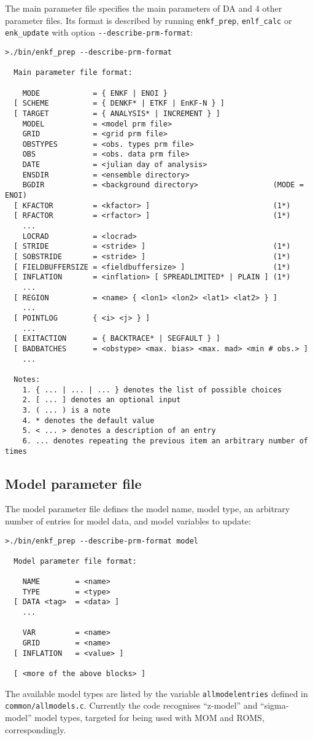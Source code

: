 \documentclass[11pt]{report}
\begin{document}
The main parameter file specifies the main parameters of DA and 4 other parameter files.
Its format is described by running \verb|enkf_prep|, \verb|enlf_calc| or \verb|enk_update| with option \verb|--describe-prm-format|:
\begin{Verbatim}[frame=single,fontsize=\footnotesize]
>./bin/enkf_prep --describe-prm-format

  Main parameter file format:

    MODE            = { ENKF | ENOI }
  [ SCHEME          = { DENKF* | ETKF | EnKF-N } ]
  [ TARGET          = { ANALYSIS* | INCREMENT } ]
    MODEL           = <model prm file>
    GRID            = <grid prm file>
    OBSTYPES        = <obs. types prm file>
    OBS             = <obs. data prm file>
    DATE            = <julian day of analysis>
    ENSDIR          = <ensemble directory>
    BGDIR           = <background directory>                 (MODE = ENOI)
  [ KFACTOR         = <kfactor> ]                            (1*)
  [ RFACTOR         = <rfactor> ]                            (1*)
    ...
    LOCRAD          = <locrad>
  [ STRIDE          = <stride> ]                             (1*)
  [ SOBSTRIDE       = <stride> ]                             (1*)
  [ FIELDBUFFERSIZE = <fieldbuffersize> ]                    (1*)
  [ INFLATION       = <inflation> [ SPREADLIMITED* | PLAIN ] (1*)
    ...
  [ REGION          = <name> { <lon1> <lon2> <lat1> <lat2> } ]
    ...
  [ POINTLOG        { <i> <j> } ]
    ...
  [ EXITACTION      = { BACKTRACE* | SEGFAULT } ]
  [ BADBATCHES      = <obstype> <max. bias> <max. mad> <min # obs.> ]
    ...

  Notes:
    1. { ... | ... | ... } denotes the list of possible choices
    2. [ ... ] denotes an optional input
    3. ( ... ) is a note
    4. * denotes the default value
    5. < ... > denotes a description of an entry
    6. ... denotes repeating the previous item an arbitrary number of times
\end{Verbatim}

\subsection{Model parameter file}

The model parameter file defines the model name, model type, an arbitrary number of entries for model data, and model variables to update:
\begin{Verbatim}[frame=single,fontsize=\footnotesize]
>./bin/enkf_prep --describe-prm-format model

  Model parameter file format:

    NAME        = <name>
    TYPE        = <type>
  [ DATA <tag>  = <data> ]
    ...

    VAR         = <name>
    GRID        = <name>
  [ INFLATION   = <value> ]

  [ <more of the above blocks> ]
\end{Verbatim}
The available model types are listed by the variable \verb|allmodelentries| defined in \verb|common/allmodels.c|.
Currently the code recognises ``z-model'' and ``sigma-model'' model types, targeted for being used with MOM and ROMS, correspondingly.
\end{document}
